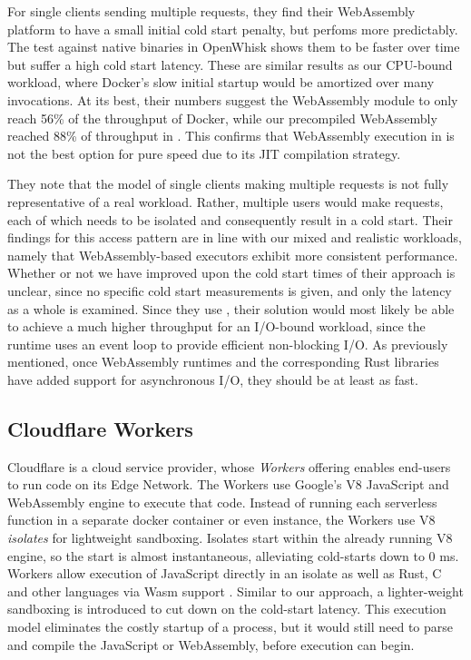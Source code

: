 For single clients sending multiple requests, they find their WebAssembly platform to have a small initial cold start penalty, but perfoms more predictably. The test against native binaries in OpenWhisk shows them to be faster over time but suffer a high cold start latency. These are similar results as our CPU-bound workload, where Docker's slow initial startup would be amortized over many invocations. At its best, their numbers suggest the WebAssembly module to only reach 56\% of the throughput of Docker, while our precompiled WebAssembly reached 88\% of throughput in . This confirms that WebAssembly execution in  is not the best option for pure speed due to its JIT compilation strategy.

They note that the model of single clients making multiple requests is not fully representative of a real workload. Rather, multiple users would make requests, each of which needs to be isolated and consequently result in a cold start. Their findings for this access pattern are in line with our mixed and realistic workloads, namely that WebAssembly-based executors exhibit more consistent performance. Whether or not we have improved upon the cold start times of their approach is unclear, since no specific cold start measurements is given, and only the latency as a whole is examined. 
Since they use , their solution would most likely be able to achieve a much higher throughput for an I/O-bound workload, since the runtime uses an event loop to provide efficient non-blocking I/O. As previously mentioned, once WebAssembly runtimes and the corresponding Rust libraries have added support for asynchronous I/O, they should be at least as fast.

\subsection{Cloudflare Workers}

Cloudflare is a cloud service provider, whose \emph{Workers} offering enables end-users to run code on its Edge Network. The Workers use Google's V8 JavaScript and WebAssembly engine to execute that code.
Instead of running each serverless function in a separate docker container or even  instance, the Workers use V8 \emph{isolates} for lightweight sandboxing. Isolates start within the already running V8 engine, so the start is almost instantaneous, alleviating cold-starts down to 0 ms.
Workers allow execution of JavaScript directly in an isolate as well as Rust, C and other languages via Wasm support \cite{Cloudflare2021}.
Similar to our approach, a lighter-weight sandboxing is introduced to cut down on the cold-start latency. This execution model eliminates the costly startup of a  process, but it would still need to parse and compile the JavaScript or WebAssembly, before execution can begin.

